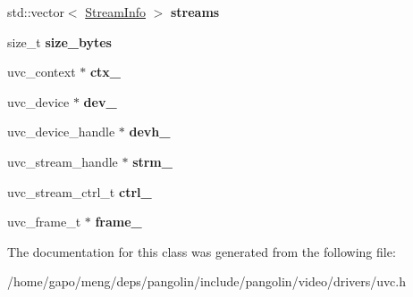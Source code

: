 \begin{DoxyCompactItemize}
\item 
std\+::vector$<$ \hyperlink{classpangolin_1_1_stream_info}{Stream\+Info} $>$ {\bfseries streams}\hypertarget{classpangolin_1_1_uvc_video_a38cc305e8fa109bd62676e81d92a088d}{}\label{classpangolin_1_1_uvc_video_a38cc305e8fa109bd62676e81d92a088d}

\item 
size\+\_\+t {\bfseries size\+\_\+bytes}\hypertarget{classpangolin_1_1_uvc_video_a4496792a1105453f9f0163ba7378b040}{}\label{classpangolin_1_1_uvc_video_a4496792a1105453f9f0163ba7378b040}

\item 
uvc\+\_\+context $\ast$ {\bfseries ctx\+\_\+}\hypertarget{classpangolin_1_1_uvc_video_a2507cb3ebaa50a57fe637c14a2a77f93}{}\label{classpangolin_1_1_uvc_video_a2507cb3ebaa50a57fe637c14a2a77f93}

\item 
uvc\+\_\+device $\ast$ {\bfseries dev\+\_\+}\hypertarget{classpangolin_1_1_uvc_video_a0cd1f79a8eb4ac856c6df7f2246cb887}{}\label{classpangolin_1_1_uvc_video_a0cd1f79a8eb4ac856c6df7f2246cb887}

\item 
uvc\+\_\+device\+\_\+handle $\ast$ {\bfseries devh\+\_\+}\hypertarget{classpangolin_1_1_uvc_video_a104b580732ce02be877f177d88404798}{}\label{classpangolin_1_1_uvc_video_a104b580732ce02be877f177d88404798}

\item 
uvc\+\_\+stream\+\_\+handle $\ast$ {\bfseries strm\+\_\+}\hypertarget{classpangolin_1_1_uvc_video_a266f5101a6fe896555a5ebdfca527bad}{}\label{classpangolin_1_1_uvc_video_a266f5101a6fe896555a5ebdfca527bad}

\item 
uvc\+\_\+stream\+\_\+ctrl\+\_\+t {\bfseries ctrl\+\_\+}\hypertarget{classpangolin_1_1_uvc_video_af4bb68870cabd8abbe1274d5d75ad013}{}\label{classpangolin_1_1_uvc_video_af4bb68870cabd8abbe1274d5d75ad013}

\item 
uvc\+\_\+frame\+\_\+t $\ast$ {\bfseries frame\+\_\+}\hypertarget{classpangolin_1_1_uvc_video_a1793af76ec1ca77dc414c58aa2e575a3}{}\label{classpangolin_1_1_uvc_video_a1793af76ec1ca77dc414c58aa2e575a3}

\end{DoxyCompactItemize}


The documentation for this class was generated from the following file\+:\begin{DoxyCompactItemize}
\item 
/home/gapo/meng/deps/pangolin/include/pangolin/video/drivers/uvc.\+h\end{DoxyCompactItemize}
